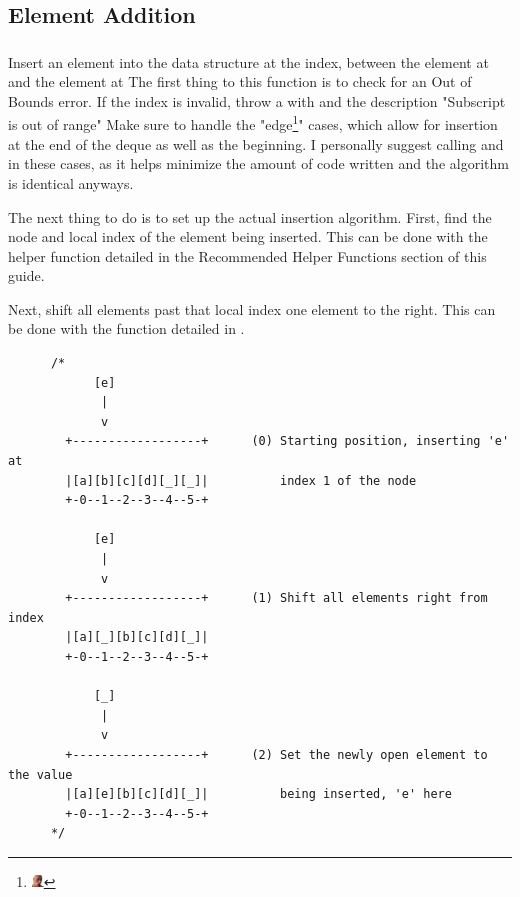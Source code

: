 \subsection{Element Addition}


\subsubsection{}
\label{func:insert}

\indent Insert an element into the data structure at the index, between the element
at \cpp{[index - 1]} and the element at \cpp{[index]}
The first thing to this function is to check for an Out of Bounds error. If
the index is invalid, throw a  with  and the
description "Subscript is out of range"
Make sure to handle the "edge\footnote{\includegraphics[width=0.025\textwidth]{edge.jpg}}" cases, which allow for insertion at the end
of the deque as well as the beginning. I personally suggest calling
 and  in these cases, as it helps minimize the amount
of code written and the algorithm is identical anyways.

\indent The next thing to do is to set up the actual insertion algorithm.
First, find the node and local index of the element being inserted. This
can be done with the  helper function detailed in the
Recommended Helper Functions section of this guide.

Next, shift all elements past that local index one element to the right.
This can be done with the  function detailed in .

\begin{verbatim}
      /*
            [e]
             |
             v
        +------------------+      (0) Starting position, inserting 'e' at
        |[a][b][c][d][_][_]|          index 1 of the node
        +-0--1--2--3--4--5-+

            [e]
             |
             v
        +------------------+      (1) Shift all elements right from index
        |[a][_][b][c][d][_]|
        +-0--1--2--3--4--5-+

            [_]
             |
             v
        +------------------+      (2) Set the newly open element to the value
        |[a][e][b][c][d][_]|          being inserted, 'e' here
        +-0--1--2--3--4--5-+
      */
\end{verbatim}


